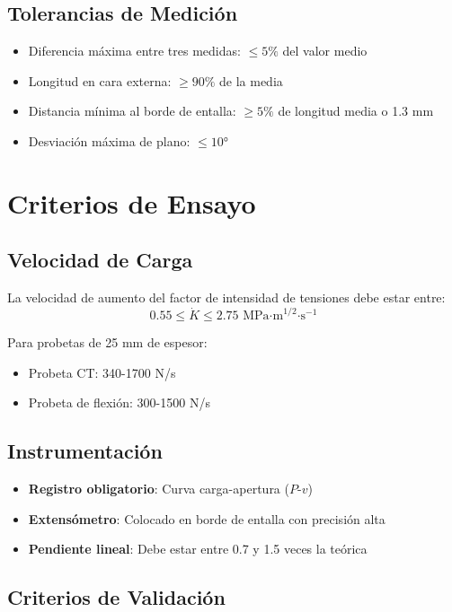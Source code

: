 \documentclass[12pt,letterpaper]{article}
\begin{document}
\subsection{Tolerancias de Medición}
\begin{itemize}
\item Diferencia máxima entre tres medidas: $\leq 5\%$ del valor medio
\item Longitud en cara externa: $\geq 90\%$ de la media
\item Distancia mínima al borde de entalla: $\geq 5\%$ de longitud media o 1.3 mm
\item Desviación máxima de plano: $\leq 10°$
\end{itemize}

\section{Criterios de Ensayo}

\subsection{Velocidad de Carga}
La velocidad de aumento del factor de intensidad de tensiones debe estar entre:
\[0.55 \leq \dot{K} \leq 2.75 \text{ MPa·m}^{1/2}\text{·s}^{-1}\]

Para probetas de 25 mm de espesor:
\begin{itemize}
\item Probeta CT: 340-1700 N/s
\item Probeta de flexión: 300-1500 N/s
\end{itemize}

\subsection{Instrumentación}
\begin{itemize}
\item \textbf{Registro obligatorio}: Curva carga-apertura ($P$-$v$)
\item \textbf{Extensómetro}: Colocado en borde de entalla con precisión alta
\item \textbf{Pendiente lineal}: Debe estar entre 0.7 y 1.5 veces la teórica
\end{itemize}

\subsection{Criterios de Validación}
\end{document}
